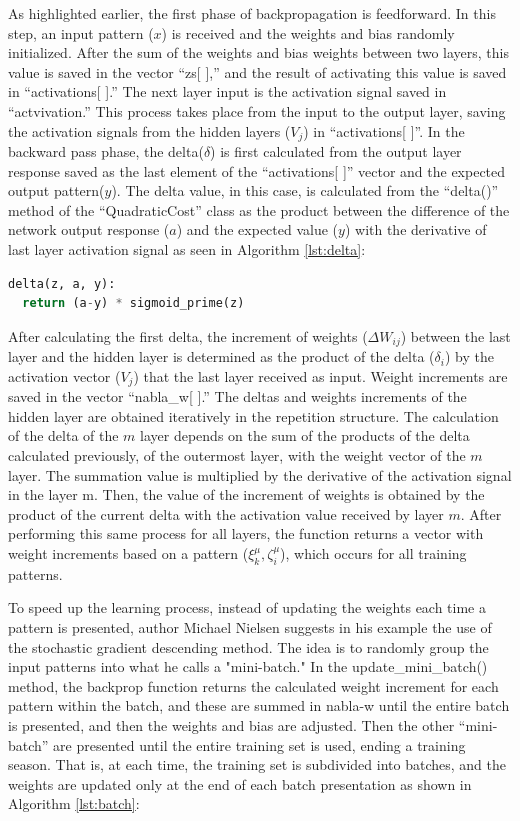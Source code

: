 As highlighted earlier, the first phase of backpropagation is feedforward. In this step, an input pattern ($x$) is received and the weights and bias randomly initialized. After the sum of the weights and bias weights between two layers, this value is saved in the vector “zs[ ],” and the result of activating this value is saved in “activations[ ].” The next layer input is the activation signal saved in “actvivation.” This process takes place from the input to the output layer, saving the activation signals from the hidden layers ($V_j$) in “activations[ ]”. In the backward pass phase, the delta($\delta$) is first calculated from the output layer response saved as the last element of the “activations[ ]” vector and the expected output pattern($y$). The delta value, in this case, is calculated from the “delta()” method of the “QuadraticCost” class as the product between the difference of the network output response ($a$) and the expected value ($y$) with the derivative of last layer activation signal as seen in Algorithm \ref{lst:delta}:

\begin{lstlisting}[caption={Delta method in Python},label={lst:delta},language=Python]
delta(z, a, y):
  return (a-y) * sigmoid_prime(z)
\end{lstlisting}

After calculating the first delta, the increment of weights ($\Delta W_{ij}$) between the last layer and the hidden layer is determined as the product of the delta ($\delta_i$) by the activation vector ($V_j$) that the last layer received as input. Weight increments are saved in the vector “nabla\_w[ ].” The deltas and weights increments of the hidden layer are obtained iteratively in the repetition structure. The calculation of the delta of the $m$ layer depends on the sum of the products of the delta calculated previously, of the outermost layer, with the weight vector of the $m$ layer. The summation value is multiplied by the derivative of the activation signal in the layer m. Then, the value of the increment of weights is obtained by the product of the current delta with the activation value received by layer $m$. After performing this same process for all layers, the function returns a vector with weight increments based on a pattern ($\xi_k^\mu,\zeta_i^\mu$), which occurs for all training patterns.

To speed up the learning process, instead of updating the weights each time a pattern is presented, author Michael Nielsen\cite{nielsen2015} suggests in his example the use of the stochastic gradient descending method. The idea is to randomly group the input patterns into what he calls a "mini-batch." In the update\_mini\_batch() method, the backprop function returns the calculated weight increment for each pattern within the batch, and these are summed in nabla-w until the entire batch is presented, and then the weights and bias are adjusted. Then the other “mini-batch” are presented until the entire training set is used, ending a training season. That is, at each time, the training set is subdivided into batches, and the weights are updated only at the end of each batch presentation as shown in Algorithm \ref{lst:batch}:

